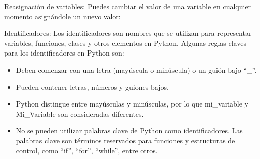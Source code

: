Reasignación de variables: Puedes cambiar el valor de una variable en cualquier momento asignándole un nuevo valor:\\
\begin{figure}[h]
    \centering
  \end{figure}

Identificadores: Los identificadores son nombres que se utilizan para representar variables, funciones, clases y otros elementos en Python. Algunas reglas claves para los identificadores en Python son:

\begin{itemize}
    \item Deben comenzar con una letra (mayúscula o minúscula) o un guión bajo ``\_''.
    \item Pueden contener letras, números y guiones bajos.
    \item Python distingue entre mayúsculas y minúsculas, por lo que mi\_variable y Mi\_Variable son consideradas diferentes.
    \item No se pueden utilizar palabras clave de Python como identificadores. Las palabras clave son términos reservados para funciones y estructuras de control, como ``if'', ``for'', ``while'', entre otros.
\end{itemize}

\begin{figure}[h]
    \centering
  \end{figure}

